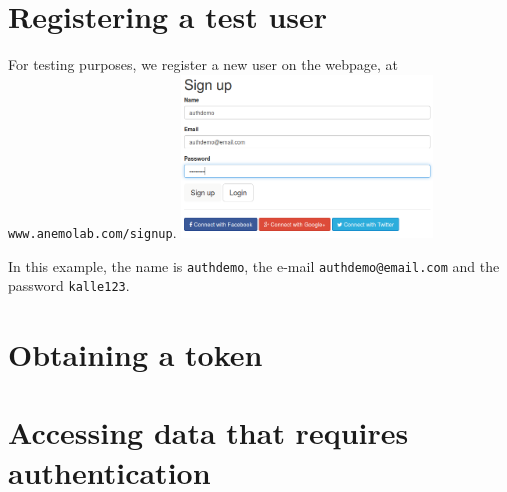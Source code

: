 \documentclass{article}
\begin{document}
\section{Registering a test user}
For testing purposes, we register a new user on the webpage, at \texttt{www.anemolab.com/signup}.
{\centering
\includegraphics[width=0.5\textwidth]{signup.png}
}

In this example, the name is \texttt{authdemo}, the e-mail \texttt{authdemo@email.com} and the password \texttt{kalle123}.
\section{Obtaining a token}
\section{Accessing data that requires authentication}
\end{document}
